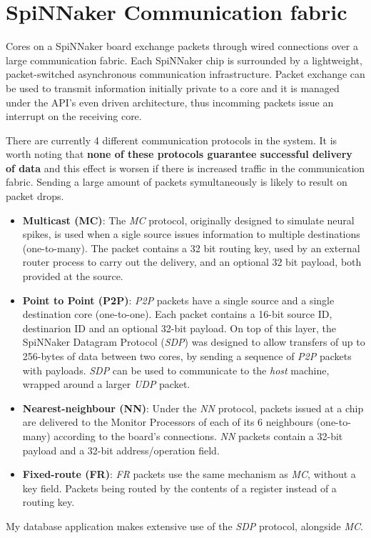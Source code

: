 \section{SpiNNaker Communication fabric}
\label{sec:comm_fabric}

Cores on a SpiNNaker board exchange packets through wired connections over a large communication fabric. Each SpiNNaker chip is surrounded by a lightweight, packet-switched asynchronous communication infrastructure.\cite{spinnchip} Packet exchange can be used to transmit information initially private to a core and it is managed under the API's even driven architecture, thus incomming packets issue an interrupt on the receiving core.

There are currently 4 different communication protocols in the system. It is worth noting that \textbf{none of these protocols guarantee successful delivery of data} and this effect is worsen if there is increased traffic in the communication fabric. Sending a large amount of packets symultaneously is likely to result on packet drops.

\begin{itemize}
\item \textbf{Multicast (MC)}: The \textit{MC} protocol, originally designed to simulate neural spikes, is used when a sigle source issues information to multiple destinations (one-to-many). The packet contains a 32 bit routing key, used by an external router process to carry out the delivery, and an optional 32 bit payload, both provided at the source.

\item \textbf{Point to Point (P2P)}: \textit{P2P} packets have a single source and a single destination core (one-to-one). Each packet contains a 16-bit source ID, destinarion ID and an optional 32-bit payload.\cite{datasheet}
On top of this layer, the SpiNNaker Datagram Protocol (\textit{SDP}) was designed to allow transfers of up to 256-bytes of data between two cores, by sending a sequence of \textit{P2P} packets with payloads.\cite{sdp} \textit{SDP} can be used to communicate to the \textit{host} machine, wrapped around a larger \textit{UDP} packet.

\item \textbf{Nearest-neighbour (NN)}: Under the \textit{NN} protocol, packets issued at a chip are delivered to the Monitor Processors of each of its 6 neighbours (one-to-many) according to the board's connections. \textit{NN} packets contain a 32-bit payload and a 32-bit address/operation field.\cite{datasheet}

\item \textbf{Fixed-route (FR)}: \textit{FR} packets use the same mechanism as \textit{MC}, without a key field. Packets being routed by the contents of a register instead of a routing key. 
\end{itemize}

My database application makes extensive use of the \textit{SDP} protocol, alongside \textit{MC}.


